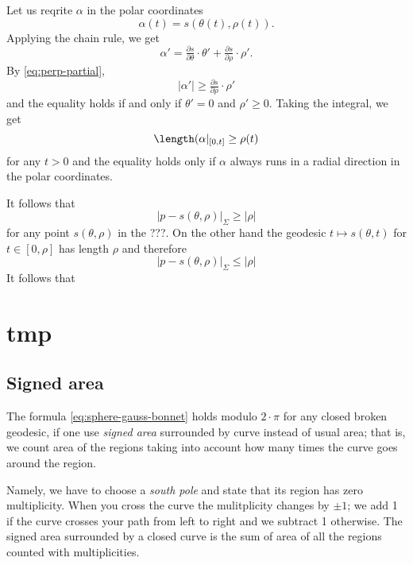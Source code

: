 Let us reqrite $\alpha$ in the polar coordinates 
\[\alpha(t)=s(\theta(t),\rho(t)).\]
Applying the chain rule, we get 
\[\alpha'=\tfrac{\partial s}{\partial\theta}\cdot\theta'+\tfrac{\partial s}{\partial\rho}\cdot\rho'.\]
By \ref{eq:perp-partial}, 
\[|\alpha'|\ge \tfrac{\partial s}{\partial\rho}\cdot\rho'\]
and the equality holds if and only if $\theta'=0$ and $\rho'\ge 0$.
Taking the integral, we get 
\[\length(\alpha|_{[0,t]}\ge\rho(t)\]
for any $t>0$ and the equality holds only if $\alpha$ always runs in a radial direction in the polar coordinates.

It follows that 
\[|p-s(\theta,\rho)|_\Sigma\ge |\rho|\]
for any point $s(\theta,\rho)$ in the ???.
On the other hand the geodesic $t\mapsto s(\theta,t)$ for $t\in[0,\rho]$ has length $\rho$ and therefore 
\[|p-s(\theta,\rho)|_\Sigma\le |\rho|\]
It follows that 































\chapter{tmp}





\section*{Signed area}
The formula \ref{eq:sphere-gauss-bonnet} holds modulo $2\cdot \pi$ for any closed broken geodesic, if one use \emph{signed area} surrounded by curve instead of usual area;
that is, we count area of the regions taking into account how many times the curve goes around the region.

Namely, we have to choose a {}\emph{south pole} and state that its region has zero multiplicity.
When you cross the curve the mulitplicity changes by $\pm1$; we add 1 if the curve crosses your path from left to right and we subtract 1 otherwise.
The signed area surrounded by a closed curve is the sum of area of all the regions counted with multiplicities.

